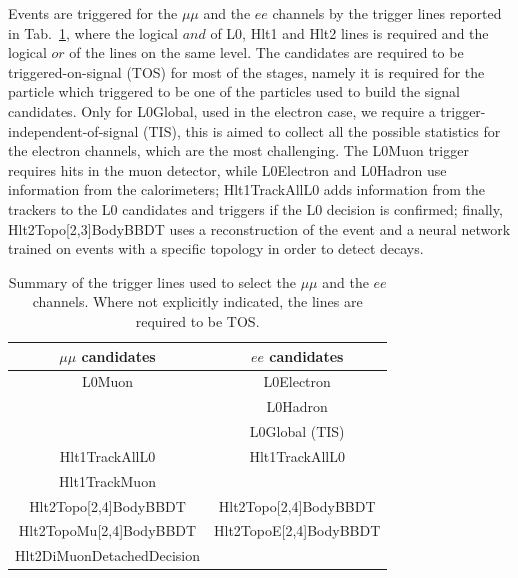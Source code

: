 Events are triggered for the $\mu\mu$ and the $ee$ channels by the trigger lines
reported in Tab.~\ref{tab:RKst_triglines}, where the logical $and$ of L0, Hlt1 and Hlt2
lines is required and the logical $or$ of the lines on the same level. The candidates are
required to be triggered-on-signal (TOS) for most of the stages, namely
it is required for the particle which triggered to be one of the particles used to build the signal candidates.
Only for L0Global, used in the electron case, we require a trigger-independent-of-signal (TIS),
this is aimed to collect all the possible statistics for the electron channels, which are the most challenging.
The L0Muon trigger requires hits in the muon detector, while L0Electron and L0Hadron use information
from the calorimeters; Hlt1TrackAllL0 adds information from the trackers to the L0 candidates and
triggers if the L0 decision is confirmed; finally, Hlt2Topo[2,3]BodyBBDT uses a reconstruction 
of the event and a neural network trained on events with a specific topology in order to detect decays.

\begin{table}[h!]
\begin{center}
\caption{Summary of the trigger lines used to select the $\mu\mu$ and the $ee$ channels.
Where not explicitly indicated, the lines are required to be TOS.}
\begin{tabular}{c|c}
$\mu\mu$ candidates &  $ee$ candidates \\
\hline
	L0Muon		& L0Electron\\
				& L0Hadron\\
				& L0Global (TIS)\\
\hline
	Hlt1TrackAllL0				& Hlt1TrackAllL0 \\
	Hlt1TrackMuon				&	 \\
\hline
	Hlt2Topo[2,4]BodyBBDT 		& Hlt2Topo[2,4]BodyBBDT \\
	Hlt2TopoMu[2,4]BodyBBDT 	& Hlt2TopoE[2,4]BodyBBDT \\
	Hlt2DiMuonDetachedDecision	&							\\
\end{tabular}
\label{tab:RKst_triglines}
\end{center}
\end{table}

